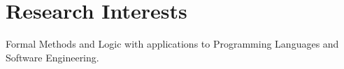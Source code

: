 \section{Research Interests}

Formal Methods and Logic with applications to Programming Languages and Software Engineering.